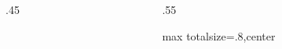 \begin{frame}
\begin{columns}[T]
\begin{column}{.45\textwidth}
        \end{column}
        \begin{column}{.55\textwidth}
            \begin{adjustbox}{max totalsize={\linewidth}{.8\textheight},center}
                
            \end{adjustbox}
        \end{column}
    \end{columns}

\end{frame}
